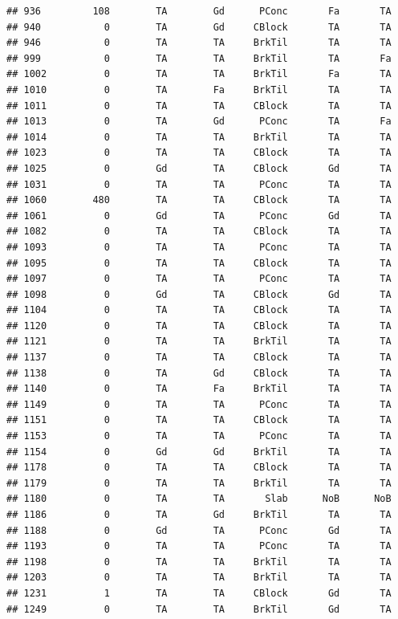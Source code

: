 \documentclass[]{article}
\begin{document}
\begin{verbatim}
## 936         108        TA        Gd      PConc       Fa       TA
## 940           0        TA        Gd     CBlock       TA       TA
## 946           0        TA        TA     BrkTil       TA       TA
## 999           0        TA        TA     BrkTil       TA       Fa
## 1002          0        TA        TA     BrkTil       Fa       TA
## 1010          0        TA        Fa     BrkTil       TA       TA
## 1011          0        TA        TA     CBlock       TA       TA
## 1013          0        TA        Gd      PConc       TA       Fa
## 1014          0        TA        TA     BrkTil       TA       TA
## 1023          0        TA        TA     CBlock       TA       TA
## 1025          0        Gd        TA     CBlock       Gd       TA
## 1031          0        TA        TA      PConc       TA       TA
## 1060        480        TA        TA     CBlock       TA       TA
## 1061          0        Gd        TA      PConc       Gd       TA
## 1082          0        TA        TA     CBlock       TA       TA
## 1093          0        TA        TA      PConc       TA       TA
## 1095          0        TA        TA     CBlock       TA       TA
## 1097          0        TA        TA      PConc       TA       TA
## 1098          0        Gd        TA     CBlock       Gd       TA
## 1104          0        TA        TA     CBlock       TA       TA
## 1120          0        TA        TA     CBlock       TA       TA
## 1121          0        TA        TA     BrkTil       TA       TA
## 1137          0        TA        TA     CBlock       TA       TA
## 1138          0        TA        Gd     CBlock       TA       TA
## 1140          0        TA        Fa     BrkTil       TA       TA
## 1149          0        TA        TA      PConc       TA       TA
## 1151          0        TA        TA     CBlock       TA       TA
## 1153          0        TA        TA      PConc       TA       TA
## 1154          0        Gd        Gd     BrkTil       TA       TA
## 1178          0        TA        TA     CBlock       TA       TA
## 1179          0        TA        TA     BrkTil       TA       TA
## 1180          0        TA        TA       Slab      NoB      NoB
## 1186          0        TA        Gd     BrkTil       TA       TA
## 1188          0        Gd        TA      PConc       Gd       TA
## 1193          0        TA        TA      PConc       TA       TA
## 1198          0        TA        TA     BrkTil       TA       TA
## 1203          0        TA        TA     BrkTil       TA       TA
## 1231          1        TA        TA     CBlock       Gd       TA
## 1249          0        TA        TA     BrkTil       Gd       TA

\end{verbatim}
\end{document}
